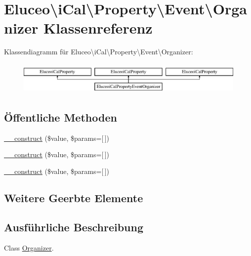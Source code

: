 \hypertarget{class_eluceo_1_1i_cal_1_1_property_1_1_event_1_1_organizer}{}\section{Eluceo\textbackslash{}i\+Cal\textbackslash{}Property\textbackslash{}Event\textbackslash{}Organizer Klassenreferenz}
\label{class_eluceo_1_1i_cal_1_1_property_1_1_event_1_1_organizer}
Klassendiagramm für Eluceo\textbackslash{}i\+Cal\textbackslash{}Property\textbackslash{}Event\textbackslash{}Organizer\+:\begin{figure}[H]
\begin{center}
\leavevmode
\includegraphics[height=1.588652cm]{class_eluceo_1_1i_cal_1_1_property_1_1_event_1_1_organizer}
\end{center}
\end{figure}
\subsection*{Öffentliche Methoden}
\begin{DoxyCompactItemize}
\item 
\mbox{\hyperlink{class_eluceo_1_1i_cal_1_1_property_1_1_event_1_1_organizer_ad769a119e999aeee82ab16aa73a1c12c}{\+\_\+\+\_\+construct}} (\$value, \$params=\mbox{[}$\,$\mbox{]})
\item 
\mbox{\hyperlink{class_eluceo_1_1i_cal_1_1_property_1_1_event_1_1_organizer_ad769a119e999aeee82ab16aa73a1c12c}{\+\_\+\+\_\+construct}} (\$value, \$params=\mbox{[}$\,$\mbox{]})
\item 
\mbox{\hyperlink{class_eluceo_1_1i_cal_1_1_property_1_1_event_1_1_organizer_ad769a119e999aeee82ab16aa73a1c12c}{\+\_\+\+\_\+construct}} (\$value, \$params=\mbox{[}$\,$\mbox{]})
\end{DoxyCompactItemize}
\subsection*{Weitere Geerbte Elemente}


\subsection{Ausführliche Beschreibung}
Class \mbox{\hyperlink{class_eluceo_1_1i_cal_1_1_property_1_1_event_1_1_organizer}{Organizer}}. 

